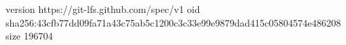 version https://git-lfs.github.com/spec/v1
oid sha256:43cfb77dd09fa71a43c75ab5c1200c3c33e99e9879dad415c05804574e486208
size 196704
